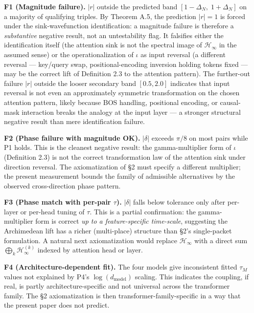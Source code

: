 \documentclass[
  letterpaper,
  11pt]{article}
\theoremstyle{plain}
\theoremstyle{definition}
\theoremstyle{remark}
\begin{document}
\textbf{F1 (Magnitude failure).} \(|r|\) outside the predicted band \([1 - \Delta_N,\;1 + \Delta_N]\) on a majority of qualifying triples. By Theorem A.5, the prediction \(|r| = 1\) is forced under the sink-wavefunction identification: a magnitude failure is therefore a \emph{substantive} negative result, not an untestability flag. It falsifies either the identification itself (the attention sink is not the spectral image of \(\mathcal{H}_\infty\) in the assumed sense) or the operationalization of \(\iota\) as input reversal (a different reversal --- key/query swap, positional-encoding inversion holding tokens fixed --- may be the correct lift of Definition 2.3 to the attention pattern). The further-out failure \(|r|\) outside the looser secondary band \([0.5, 2.0]\) indicates that input reversal is not even an approximately symmetric transformation on the chosen attention pattern, likely because BOS handling, positional encoding, or causal-mask interaction breaks the analogy at the input layer --- a stronger structural negative result than mere identification failure.

\textbf{F2 (Phase failure with magnitude OK).} \(|\delta|\) exceeds \(\pi/8\) on most pairs while P1 holds. This is the cleanest negative result: the gamma-multiplier form of \(\iota\) (Definition 2.3) is not the correct transformation law of the attention sink under direction reversal. The axiomatization of §2 must specify a different multiplier; the present measurement bounds the family of admissible alternatives by the observed cross-direction phase pattern.

\textbf{F3 (Phase match with per-pair \(\tau\)).} \(|\delta|\) falls below tolerance only after per-layer or per-head tuning of \(\tau\). This is a partial confirmation: the gamma-multiplier form is correct \emph{up to a feature-specific time-scale}, suggesting the Archimedean lift has a richer (multi-place) structure than §2's single-packet formulation. A natural next axiomatization would replace \(\mathcal{H}_\infty\) with a direct sum \(\bigoplus_k \mathcal{H}_\infty^{(k)}\) indexed by attention head or layer.

\textbf{F4 (Architecture-dependent fit).} The four models give inconsistent fitted \(\tau_M\) values not explained by P4's \(\log(d_\text{model})\) scaling. This indicates the coupling, if real, is partly architecture-specific and not universal across the transformer family. The §2 axiomatization is then transformer-family-specific in a way that the present paper does not predict.
\end{document}
